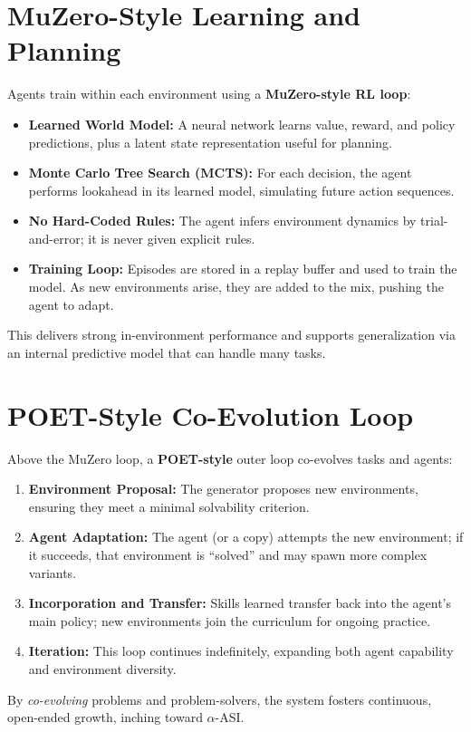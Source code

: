 \documentclass{article}
\begin{document}
\section{MuZero-Style Learning and Planning}
Agents train within each environment using a \textbf{MuZero-style RL loop}:
\begin{itemize}
  \item \textbf{Learned World Model:} A neural network learns value, reward, and policy predictions, plus a latent state representation useful for planning.
  \item \textbf{Monte Carlo Tree Search (MCTS):} For each decision, the agent performs lookahead in its learned model, simulating future action sequences.
  \item \textbf{No Hard-Coded Rules:} The agent infers environment dynamics by trial-and-error; it is never given explicit rules.
  \item \textbf{Training Loop:} Episodes are stored in a replay buffer and used to train the model. As new environments arise, they are added to the mix, pushing the agent to adapt.
\end{itemize}
This delivers strong in-environment performance and supports generalization via an internal predictive model that can handle many tasks.

\section{POET-Style Co-Evolution Loop}
Above the MuZero loop, a \textbf{POET-style} outer loop co-evolves tasks and agents:
\begin{enumerate}
  \item \textbf{Environment Proposal:} The generator proposes new environments, ensuring they meet a minimal solvability criterion.
  \item \textbf{Agent Adaptation:} The agent (or a copy) attempts the new environment; if it succeeds, that environment is “solved” and may spawn more complex variants.
  \item \textbf{Incorporation and Transfer:} Skills learned transfer back into the agent’s main policy; new environments join the curriculum for ongoing practice.
  \item \textbf{Iteration:} This loop continues indefinitely, expanding both agent capability and environment diversity.
\end{enumerate}
By \emph{co-evolving} problems and problem-solvers, the system fosters continuous, open-ended growth, inching toward \(\alpha\)-ASI.
\end{document}
